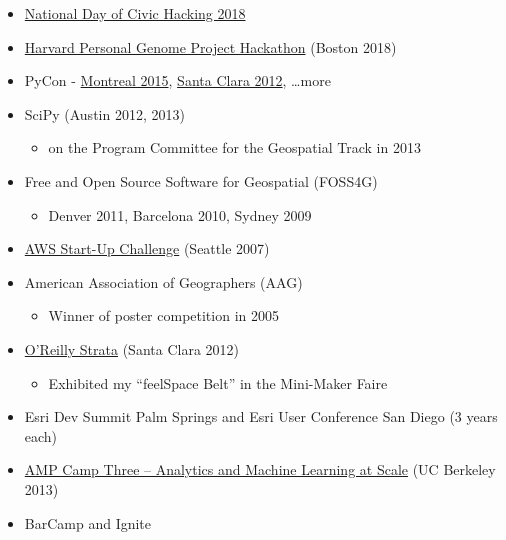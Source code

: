 \documentclass[12pt]{article}
\newenvironment{mitemize}
               {%
                 \setlength{\parskip}{3pt}
                 \setlength{\itemsep}{2.5pt plus 1pt}
                 \begin{itemize}}
               {\end{itemize}}
\begin{document}
\begin{mitemize}
\begin{mitemize}
    \item Full-day \href{https://conferences.oreilly.com/jupyter/jup-ny/public/schedule/detail/69752}{Kubernetes Tutorial}
    \item \href{https://conferences.oreilly.com/jupyter/jup-ny/public/schedule/detail/71214}{JupyterCon Community Sprint Day}
  \end{mitemize}
\item \href{https://codefortampabay.org/ndch-2018/}{National Day of Civic Hacking 2018}
\item \href{https://pgp.med.harvard.edu/events/pgp-hackathon-1-0}{Harvard Personal Genome Project Hackathon} (Boston 2018)
\item PyCon - \href{https://us.pycon.org/2015/}{Montreal 2015}, \href{https://us.pycon.org/2012/}{Santa Clara 2012}, \ldots more
\item SciPy (Austin 2012, 2013)
  \begin{mitemize}
    \item on the Program Committee for the Geospatial Track in 2013
  \end{mitemize}
\item Free and Open Source Software for Geospatial (FOSS4G)
  \begin{mitemize}
    \item Denver 2011, Barcelona 2010, Sydney 2009
  \end{mitemize}
\item \href{https://aws.amazon.com/blogs/aws/start-up-challe/}{AWS Start-Up Challenge} (Seattle 2007)
\item American Association of Geographers (AAG)
  \begin{mitemize}
    \item Winner of poster competition in 2005
  \end{mitemize}
\item \href{https://conferences.oreilly.com/strata/strata2012}{O'Reilly Strata} (Santa Clara 2012)
  \begin{mitemize}
    \item Exhibited my ``feelSpace Belt'' in the Mini-Maker Faire
  \end{mitemize}
\item Esri Dev Summit Palm Springs and Esri User Conference San Diego (3 years each)
\item \href{http://ampcamp.berkeley.edu/3/}{AMP Camp Three – Analytics and Machine Learning at Scale} (UC Berkeley 2013)
\item BarCamp and Ignite
  \begin{mitemize}

\end{mitemize}
\end{mitemize}
\end{document}
